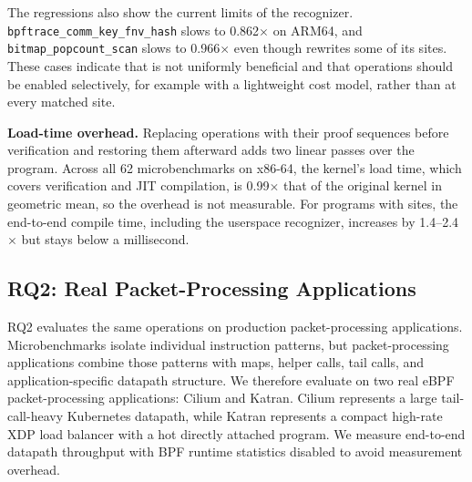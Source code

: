 The regressions also show the current limits of the recognizer.
\texttt{bpftrace\_comm\_key\_fnv\_hash} slows to 0.862$\times$ on ARM64, and \texttt{bitmap\_popcount\_scan} slows to 0.966$\times$ even though \lang rewrites some of its sites.
These cases indicate that \lang is not uniformly beneficial and that \lang operations should be enabled selectively, for example with a lightweight cost model, rather than at every matched site.

\noindent\textbf{Load-time overhead.}
Replacing \lang operations with their proof sequences before verification and restoring them afterward adds two linear passes over the program.
Across all 62 microbenchmarks on x86-64, the kernel's load time, which covers verification and JIT compilation, is 0.99$\times$ that of the original kernel in geometric mean, so the overhead is not measurable.
For programs with \lang sites, the end-to-end compile time, including the userspace recognizer, increases by 1.4--2.4$\times$ but stays below a millisecond.



\subsection{RQ2: Real Packet-Processing Applications}
\label{subsec:corpus_application}

RQ2 evaluates the same \lang operations on production packet-processing applications.
Microbenchmarks isolate individual instruction patterns, but packet-processing applications combine those patterns with maps, helper calls, tail calls, and application-specific datapath structure.
We therefore evaluate \lang on two real eBPF packet-processing applications: Cilium and Katran.
Cilium represents a large tail-call-heavy Kubernetes datapath, while Katran represents a compact high-rate XDP load balancer with a hot directly attached program.
We measure end-to-end datapath throughput with BPF runtime statistics disabled to avoid measurement overhead.

